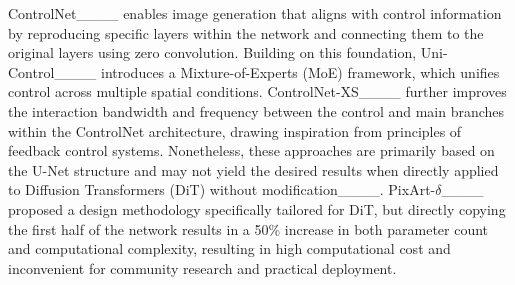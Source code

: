 ControlNet____ enables image generation that aligns with control information by reproducing specific layers within the network and connecting them to the original layers using zero convolution. Building on this foundation, Uni-Control____ introduces a Mixture-of-Experts (MoE) framework, which unifies control across multiple spatial conditions. ControlNet-XS____ further improves the interaction bandwidth and frequency between the control and main branches within the ControlNet architecture, drawing inspiration from principles of feedback control systems. Nonetheless, these approaches are primarily based on the U-Net structure and may not yield the desired results when directly applied to Diffusion Transformers (DiT) without modification____. PixArt-$\delta$____ proposed a design methodology specifically tailored for DiT, but directly copying the first half of the network results in a 50\% increase in both parameter count and computational complexity, resulting in high computational cost and inconvenient for community research and practical deployment.
